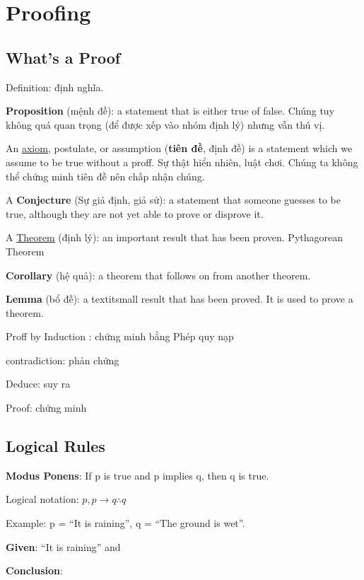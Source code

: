 \chapter{Proofing}

\section{What's a Proof}

Definition: định nghĩa.

\textbf{Proposition} (mệnh đề): a statement that is either true of false. Chúng tuy không quá quan trọng (để được xếp vào nhóm định lý) nhưng vẫn thú vị.

An \href{https://en.wikipedia.org/wiki/Axiom}{axiom}, postulate, or assumption (\textbf{tiên đề}, định đề) is a statement which we assume to be true without a proff. Sự thật hiển nhiên, luật chơi. Chúng ta không thể chứng minh tiên đề nên chấp nhận chúng.

A \textbf{Conjecture} (Sự giả định, giả sử): a statement that someone guesses to be true, although they are not yet able to prove or disprove it.

A \href{https://en.wikipedia.org/wiki/Theorem}{Theorem} (định lý): an important result that has been proven. Pythagorean Theorem

\textbf{Corollary} (hệ quả): a theorem that follows on from another theorem.

\textbf{Lemma} (bổ đề): a textit{small} result that has been proved. It is used to prove a theorem.

Proff by Induction : chứng minh bằng Phép quy nạp

contradiction: phản chứng

Deduce: suy ra

Proof: chứng minh

\section{Logical Rules}

\noindent \textbf{Modus Ponens}: If p is true and p implies q, then q is true.

Logical notation: \(p,p \rightarrow q \therefore q\)

Example: p = ``It is raining'', q = ``The ground is wet''.

\textbf{Given}: ``It is raining'' and 

\textbf{Conclusion}: 

